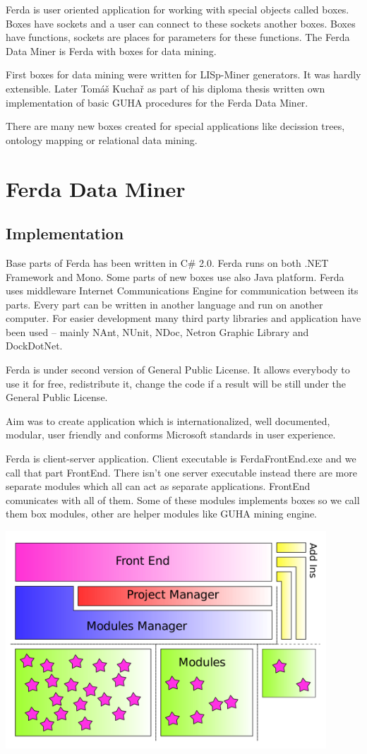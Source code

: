 \documentclass[a4paper,12pt]{book}
\begin{document}
Ferda is user oriented application for working with special objects called boxes. Boxes have sockets and a user can connect to these sockets another boxes. Boxes have functions, sockets are places for parameters for these functions. The Ferda Data Miner is Ferda with boxes for data mining.

First boxes for data mining were written for LISp-Miner generators. It was hardly extensible. Later Tomáš Kuchař as part of his diploma thesis written own implementation of basic GUHA procedures for the Ferda Data Miner.

There are many new boxes created for special applications like decission trees, ontology mapping or relational data mining.

\section{Ferda Data Miner}
\subsection{Implementation}

Base parts of Ferda has been written in C\# 2.0. Ferda runs on both .NET Framework and Mono. Some parts of new boxes use also Java platform. Ferda uses middleware Internet Communications Engine for communication between its parts. Every part can be written in another language and run on another computer. For easier development many third party libraries and application have been used -- mainly NAnt, NUnit, NDoc, Netron Graphic Library and DockDotNet. 

Ferda is under second version of General Public License. It allows everybody to use it for free, redistribute it, change the code if a result will be still under the General Public License.

Aim was to create application which is internationalized, well documented, modular, user friendly and conforms Microsoft standards in user experience.

Ferda is client-server application. Client executable is FerdaFrontEnd.exe and we call that part FrontEnd. There isn't one server executable instead there are more separate modules which all can act as separate applications. FrontEnd comunicates with all of them. Some of these modules implements boxes so we call them box modules, other are helper modules like GUHA mining engine.

\noindent\includegraphics[width=12cm]{designB}
\end{document}
